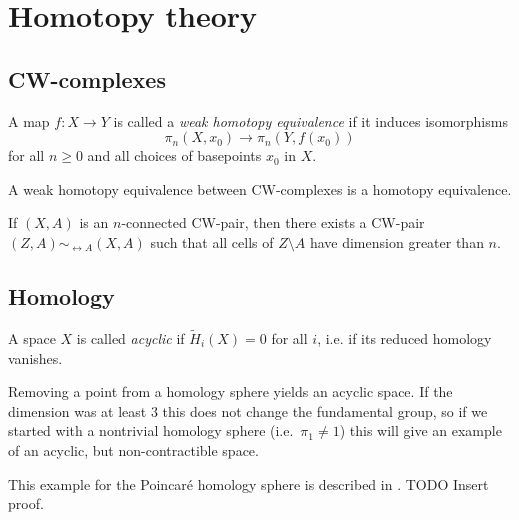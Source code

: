 \chapter{Homotopy theory}

\section{CW-complexes}

\begin{definition}
	A map $f \colon X \rightarrow Y$ is called a
	\textit{weak homotopy equivalence} 
	if it induces isomorphisms
	\[
	\pi_n(X, x_0) \rightarrow \pi_n(Y, f(x_0))
	\]
	for all $n \ge 0$ and all choices of basepoints $x_0$ in $X$.
\end{definition}

\begin{theorem}
	A weak homotopy equivalence between CW-complexes is a homotopy equivalence.
\end{theorem}

\begin{proposition}
	If $(X, A)$ is an $n$-connected CW-pair, then there exists
	a CW-pair $(Z, A) \sim_{\rel A} (X, A)$
	such that all cells of $Z \setminus A$ have dimension greater than $n$.
\end{proposition}

\section{Homology}

\begin{definition}[Acyclic]
	A space $X$ is called \textit{acyclic} if $\widetilde{H}_{i}(X) = 0$ for all $i$,
	i.e. if its reduced homology vanishes.
\end{definition}

\begin{example}
	Removing a point from a homology sphere yields an acyclic space.
	If the dimension was at least $3$ this does not change
	the fundamental group, so if we started with a nontrivial homology sphere
	(i.e.\ $\pi_1 \ne 1$) this will give an example of an acyclic, but
	non-contractible space.
	
	This example for the Poincar\'e homology sphere is described in
	\citep[Example 2.38]{hatcher2002algebraic}.
	TODO Insert proof. %
\end{example}